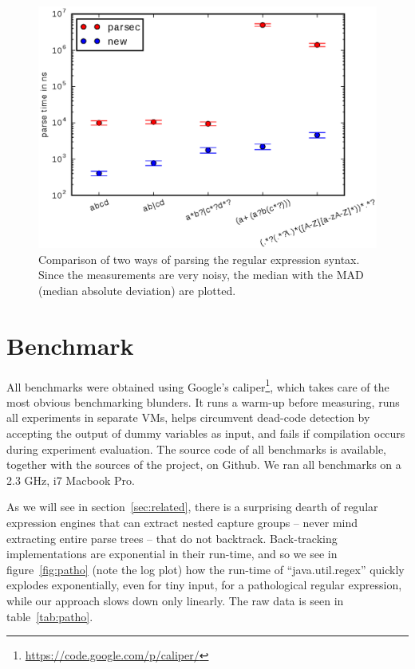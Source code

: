 \documentclass[english,twocolumn]{article}
\theoremstyle{definition}
\newcommand{\Figref}[1]{figure~\ref{fig:#1}}
\newcommand{\Secref}[1]{section~\ref{sec:#1}}
\newcommand{\Tabref}[1]{table~\ref{tab:#1}}
\newcommand{\figlabel}[1]{\label{fig:#1}}
\newcommand{\seclabel}[1]{\label{sec:#1}}
\begin{document}
\begin{figure}
  \includegraphics[width=\linewidth]{graphs/logplot-parserspeed-robust}

  \caption{\figlabel{regex-syntax-parsing}Comparison of two ways of parsing the
regular expression syntax. Since the measurements are very noisy, the median 
with the MAD (median absolute deviation) are plotted.}
\end{figure}

\section{Benchmark}
\seclabel{benchmarks}
All benchmarks were obtained using Google's
caliper\footnote{\url{https://code.google.com/p/caliper/}}, which
takes care of the most obvious benchmarking blunders.  It runs a
warm-up before measuring, runs all experiments in separate VMs,
helps circumvent dead-code detection by accepting the output of
dummy variables as input, and fails if compilation occurs during
experiment evaluation.  The source code of all benchmarks is
available, together with the sources of the project, on Github. We
ran all benchmarks on a 2.3 GHz, i7 Macbook Pro.

As we will see in \Secref{related}, there is a surprising dearth
of regular expression engines that can extract nested capture groups
-- never mind extracting entire parse trees -- that do not backtrack.
Back-tracking implementations are exponential in their run-time,
and so we see in \Figref{patho} (note the log plot) how the run-time
of ``java.util.regex'' quickly explodes exponentially, even for tiny input, for
a pathological regular expression, while our approach slows down
only linearly. The raw data is seen in \Tabref{patho}.
\end{document}
